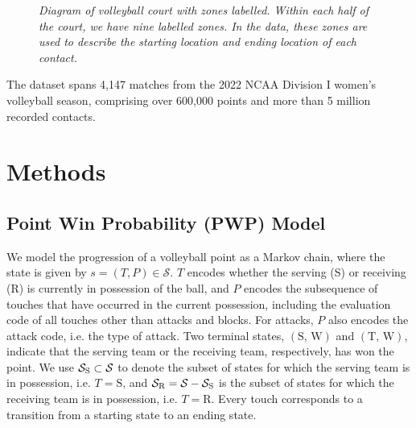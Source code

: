 \documentclass{article}
\begin{document}
\begin{figure}[h]
    \centering
    \caption{\it Diagram of volleyball court with zones labelled. Within each half of the court, we have nine labelled zones. In the data, these zones are used to describe the starting location and ending location of each contact.}
    \label{fig:volleyball-court-diagram}
\end{figure}

The dataset spans 4,147 matches from the 2022 NCAA Division I women's volleyball season, comprising over 600,000 points and more than 5 million recorded contacts.


\section{Methods}

\subsection{Point Win Probability (PWP) Model}

We model the progression of a volleyball point as a Markov chain, where the state is given by $s = (T, P) \in \mathcal{S}$. $T$ encodes whether the serving (S) or receiving (R) is currently in possession of the ball, and $P$ encodes the subsequence of touches that have occurred in the current possession, including the evaluation code of all touches other than attacks and blocks. For attacks, $P$ also encodes the attack code, i.e. the type of attack. Two terminal states, $(\mbox{S, W})$ and $(\mbox{T, W})$, indicate that the serving team or the receiving team, respectively, has won the point. We use $\mathcal{S}_{\mbox{\scriptsize S}} \subset \mathcal{S}$ to denote the subset of states for which the serving team is in possession, i.e. $T = \mbox{S}$, and $\mathcal{S}_{\mbox{\scriptsize R}} = \mathcal{S} - \mathcal{S}_{\mbox{\scriptsize S}}$ is the subset of states for which the receiving team is in possession, i.e. $T = \mbox{R}$. Every touch corresponds to a transition from a starting state to an ending state.
\end{document}
